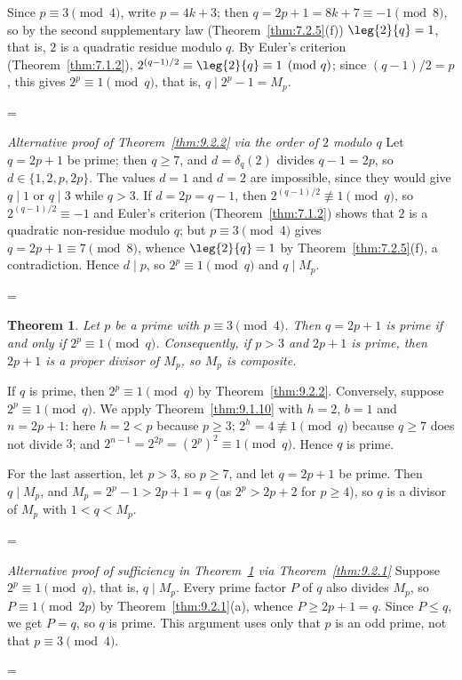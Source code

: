 \documentclass[11pt]{article}
\makeatletter
\theoremstyle{ntstyle}
\newtheorem{theorem}{Theorem}[subsection]
\let\nt@closedisplay\]
\def\nt@guardedclose{\@ifnextchar\par{\nt@closeafterpar}{\@ifnextchar\end{\postdisplaypenalty\@M\nt@closedisplay}{\nt@closedisplay}}}
\def\nt@closeafterpar\par{\@ifnextchar\par{\nt@closeafterpar}{\@ifnextchar\end{\postdisplaypenalty\@M\nt@closedisplay\par}{\nt@closedisplay\par}}}
\renewenvironment{proof}[1][\proofname]{\par
  \pushQED{\qed}\normalfont\topsep\medskipamount\edef\nt@afterproof{\@endparpenalty=\the\@endparpenalty\relax}\@beginparpenalty\@M\@endparpenalty\@M\let\]\nt@guardedclose\trivlist\item[]\textit{#1\@addpunct{.}} \ignorespaces}{\ifvmode\addpenalty\@M\fi\popQED\nt@afterproof\endtrivlist\@endpefalse}
\newenvironment{altproof}[1][\proofname]{\begin{proof}[#1]\renewcommand{\qedsymbol}{}}{\end{proof}}
\makeatother
\begin{document}
\begin{proof} Since $p \equiv 3 \pmod{4}$, write $p = 4k +
		3$; then $q = 2p + 1 = 8k + 7 \equiv -1 \pmod{8}$, so by the second
	supplementary law (Theorem~\ref{thm:7.2.5}(f)) $\leg{2}{q} = 1$, that is, $2$ is a
	quadratic residue modulo $q$. By Euler's criterion (Theorem~\ref{thm:7.1.2}),
	$2^{(q-1)/2} \equiv \leg{2}{q} \equiv 1 \pmod{q}$; since
	$(q-1)/2 = p$, this gives $2^{p} \equiv 1 \pmod{q}$, that is, $q \mid
		2^{p} - 1 = M_p$.

\end{proof}
\begin{altproof}[Alternative proof of Theorem~\ref{thm:9.2.2} via the order of $2$ modulo $q$]
	Let $q=2p+1$ be prime; then $q\ge7$, and $d=\delta_q(2)$ divides
	$q-1=2p$, so $d\in\{1,2,p,2p\}$. The values $d=1$ and $d=2$ are
	impossible, since they would give $q\mid1$ or $q\mid3$ while $q>3$. If
	$d=2p=q-1$, then $2^{(q-1)/2}\not\equiv1\pmod{q}$, so
	$2^{(q-1)/2}\equiv-1$ and Euler's criterion (Theorem~\ref{thm:7.1.2}) shows that $2$ is
	a quadratic non-residue modulo $q$; but $p\equiv3\pmod{4}$ gives
	$q=2p+1\equiv7\pmod{8}$, whence $\leg{2}{q}=1$ by Theorem~\ref{thm:7.2.5}(f),
	a contradiction. Hence $d\mid p$, so $2^{p}\equiv1\pmod{q}$
	and $q\mid M_p$.

\end{altproof}
\begin{theorem}\label{thm:9.2.3} Let $p$ be a prime with
	$p\equiv3\pmod{4}$. Then $q=2p+1$ is prime if and only if
	$2^{p}\equiv1\pmod{q}$. Consequently, if $p>3$ and $2p+1$ is prime, then
	$2p+1$ is a proper divisor of $M_p$, so $M_p$ is composite.

\end{theorem}

\begin{proof} If $q$ is prime, then $2^{p}\equiv1\pmod{q}$ by
	Theorem~\ref{thm:9.2.2}. Conversely, suppose $2^{p}\equiv1\pmod{q}$. We
	apply Theorem~\ref{thm:9.1.10} with $h=2$, $b=1$ and $n=2p+1$: here
	$h=2<p$ because $p\ge3$; $2^{h}=4\not\equiv1\pmod{q}$ because $q\ge7$ does
	not divide $3$; and $2^{n-1}=2^{2p}=(2^{p})^{2}\equiv1\pmod{q}$. Hence $q$
	is prime.

	For the last assertion, let $p>3$, so $p\ge7$, and let $q=2p+1$ be prime.
	Then $q\mid M_p$, and $M_p=2^{p}-1>2p+1=q$ (as $2^{p}>2p+2$ for $p\ge4$),
	so $q$ is a divisor of $M_p$ with $1<q<M_p$.

\end{proof}
\begin{altproof}[Alternative proof of sufficiency in Theorem~\ref{thm:9.2.3} via Theorem~\ref{thm:9.2.1}]
	Suppose $2^{p}\equiv1\pmod{q}$, that is, $q\mid M_p$. Every prime factor
	$P$ of $q$ also divides $M_p$, so $P\equiv1\pmod{2p}$ by
	Theorem~\ref{thm:9.2.1}(a), whence $P\ge2p+1=q$. Since $P\le q$, we get
	$P=q$, so $q$ is prime. This argument uses only that $p$ is an odd
	prime, not that $p\equiv3\pmod{4}$.

\end{altproof}
\end{document}
